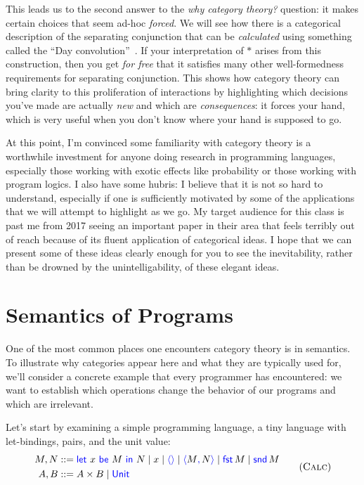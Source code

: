 This leads us to the second answer to the \emph{why category theory?}
question: it makes certain choices that seem ad-hoc \emph{forced}.  We will see
how there is a categorical description of the separating
conjunction that can be \emph{calculated} using something called the ``Day
convolution''~\citep{dongol2016convolution,biering2007bi}.
If your 
interpretation of $*$ arises from this construction, then you get \emph{for free}
that it satisfies many other well-formedness requirements for separating conjunction.
This shows how category 
theory can bring clarity to this 
proliferation of interactions by highlighting which decisions you've made 
are actually \emph{new} and which are \emph{consequences}: it forces your hand,
which is very useful when you don't know where your hand is supposed to go.

At this point, I'm convinced some familiarity with category theory 
is a worthwhile investment for anyone doing research in programming 
languages, especially those working with exotic effects like 
probability or those working with program logics. I also have some hubris: 
I believe that it is not so hard to understand, especially if one 
is sufficiently motivated by some of the applications that we will 
attempt to highlight as we go.
My target audience for this class is past me from 2017 seeing an important 
paper in their area that feels terribly out of reach because of its 
fluent application of categorical ideas. I hope that we can 
present some of these ideas clearly enough for you to see the inevitability, 
rather than be drowned by the unintelligability, of these elegant ideas.

\chapter{Semantics of Programs}

One of the most common places one encounters category theory is in semantics. To
illustrate why categories appear here and what they are typically used for,
we'll consider a concrete example that every programmer has encountered: 
we want to establish which operations change the behavior of our programs
and which are irrelevant.

Let's start by examining a simple programming language, a tiny language 
with let-bindings, pairs, and the unit value:
\begin{gather}
  \begin{aligned}
  M,N &::= \pllet{x}{M}{N} \mid x \mid \plunit{} \mid \plpair{M}{N} \mid \plfst{M} \mid \plsnd{M} \\
  A,B &::= A \times B \mid \plUnit
  \end{aligned}
  \tag{\textsc{Calc}}
  \label{lang:calc}
\end{gather}

